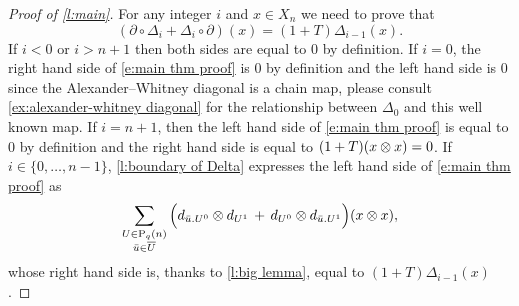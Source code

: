 \begin{proof}[Proof of \cref{l:main}]
	For any integer $i$ and $x \in X_n$ we need to prove that
	\begin{equation} \label{e:main thm proof}
	(\partial \circ \Delta_{i} + \Delta_{i} \circ \partial)(x) = (1 + T) \Delta_{i-1}(x).
	\end{equation}
	If $i < 0$ or $i > n+1$ then both sides are equal to $0$ by definition.
	If $i = 0$, the right hand side of \eqref{e:main thm proof} is $0$ by definition and the left hand side is $0$ since the Alexander--Whitney diagonal is a chain map, please consult \cref{ex:alexander-whitney diagonal} for the relationship between $\Delta_0$ and this well known map.
	If $i = n+1$, then the left hand side of \eqref{e:main thm proof} is equal to $0$ by definition and the right hand side is equal to $(1+T) (x \otimes x) = 0$.
	If $i \in \{0, \dots, n-1\}$, \cref{l:boundary of Delta} expresses the left hand side of \eqref{e:main thm proof} as
	\begin{equation*}
	\sum_{\substack{U \in \mathrm{P}_{q}(n) \\ {\bar{u}} \in \overline{U}}} \Big( d_{{\bar{u}}.U^0} \otimes d_{U^1} \, + \, d_{U^0} \otimes d_{{\bar{u}}.U^1} \Big) (x \otimes x),
	\end{equation*}
	whose right hand side is, thanks to \cref{l:big lemma}, equal to $(1+T)\Delta_{i-1}(x)$.
\end{proof}